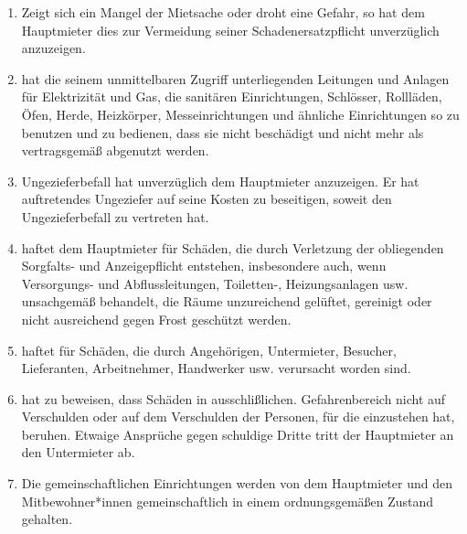 \documentclass{scrreprt}[12pt,a4paper,twoside,duplex]
\begin{document}
\begin{contract}
\label{clause:instandhaltung}
\begin{enumerate}
	\item Zeigt sich ein Mangel der Mietsache oder droht eine Gefahr, so hat  dem Hauptmieter dies zur Vermeidung seiner Schadenersatzpflicht unverzüglich anzuzeigen.
	
	\item {} hat die seinem unmittelbaren Zugriff unterliegenden Leitungen und Anlagen für Elektrizität und Gas, die sanitären Einrichtungen, Schlösser, Rollläden, Öfen, Herde, Heizkörper, Messeinrichtungen und ähnliche Einrichtungen so zu benutzen und zu bedienen, dass sie nicht beschädigt und nicht mehr als vertragsgemä{\ss} abgenutzt werden.
	
	\item Ungezieferbefall hat  unverzüglich dem Hauptmieter anzuzeigen. Er hat auftretendes Ungeziefer auf seine Kosten zu beseitigen, soweit  den Ungezieferbefall zu vertreten hat.
	
	\item {} haftet dem Hauptmieter für Schäden, die durch Verletzung der  obliegenden Sorgfalts- und Anzeigepflicht entstehen, insbesondere auch, wenn Ver\-sor\-gungs- und Abflussleitungen, Toiletten-, Heizungsanlagen usw. unsachgemä{\ss} behandelt, die Räume unzureichend gelüftet, gereinigt oder nicht ausreichend gegen Frost geschützt werden.
	
	\item {} haftet für Schäden, die durch  Angehörigen, Untermieter, Besucher, Lieferanten, Arbeitnehmer, Handwerker usw. verursacht worden sind.
	
	\item {} hat zu beweisen, dass Schäden in  ausschli{\ss}lichen. Gefahrenbereich nicht auf  Verschulden oder auf dem Verschulden der Personen, für die  einzustehen hat, beruhen. Etwaige Ansprüche gegen schuldige Dritte tritt der Hauptmieter an den Untermieter ab.
	
	\item Die gemeinschaftlichen Einrichtungen werden von dem Hauptmieter und den Mitbewohner*innen gemeinschaftlich in einem	ordnungsgemä{\ss}en Zustand gehalten.
\end{enumerate}
\end{contract}
\end{document}
